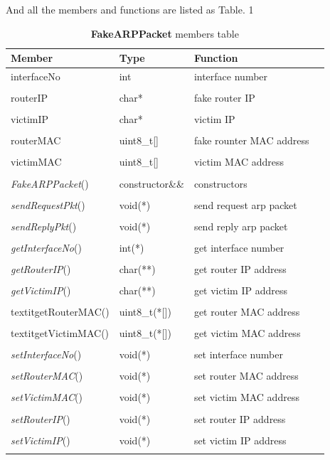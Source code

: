 \documentclass[conference]{IEEEtran}
\begin{document}
And all the members and functions are listed as Table. 1
\begin{table}[H]
		\caption{\textbf{FakeARPPacket} members table}
		\label{Tab:FakeARPPacket}
		\centering
		\begin{tabular}{lp{2cm}p{3cm}p{0cm}}
			\toprule
			\textbf{Member} &\textbf{Type} &\textbf{Function}&\\
			\midrule
			interfaceNo        &int  	&interface number    \\\\
			routerIP           &char*  & fake router IP\\\\
			victimIP           &char*  & victim IP \\\\   
			routerMAC          &uint8\_t[] & fake rounter MAC address\\\\
			victimMAC          &uint8\_t[] & victim MAC address \\\\
			\midrule
			\textit{FakeARPPacket}()    & constructor\&\& & constructors \\\\
			\textit{sendRequestPkt}()    & void(*)      & send request arp packet\\\\
			\textit{sendReplyPkt}()      & void(*)      & send reply arp packet\\\\
			\textit{getInterfaceNo}()    & int(*)       & get interface number\\\\
			\textit{getRouterIP}()       & char(**)       & get router IP address\\\\
			\textit{getVictimIP}()       & char(**)     & get victim IP address\\\\
			textit{getRouterMAC}()       & uint8\_t(*[]) & get router MAC address\\\\
			textit{getVictimMAC}()       & uint8\_t(*[]) & get victim MAC address\\\\ 
			\textit{setInterfaceNo}()    & void(*)       & set interface number\\\\
			\textit{setRouterMAC}()      & void(*)       & set router MAC address\\\\
			\textit{setVictimMAC}()      & void(*)       & set victim MAC address\\\\
			\textit{setRouterIP}()       & void(*)       & set router IP address\\\\
			\textit{setVictimIP}()       & void(*)       & set victim IP address\\\\
			\bottomrule
		\end{tabular}
\end{table}
\end{document}
